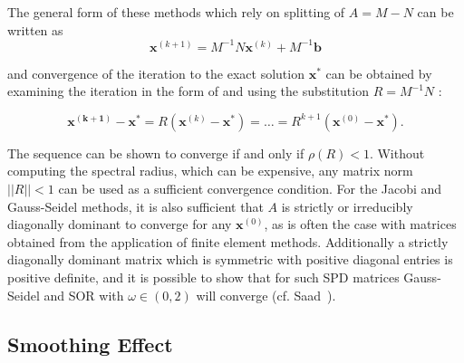 
The general form of these methods which rely on splitting of $A = M - N$ can be written as
\begin{equation}
	\mathbf{x}^{(k+1)} = M^{-1}N\mathbf{x}^{(k)} + M^{-1}\mathbf{b}
\end{equation}

and convergence of the iteration to the exact solution $\mathbf{x}^*$ can be obtained by examining the iteration in the form of and using the substitution $R = M^{-1}N $ :

\begin{equation}
	\mathbf{x^{(k+1)}} - \mathbf{x}^* = R\left(\mathbf{x}^{(k)} - \mathbf{x}^* \right) = \ldots = R^{k+1}\left(\mathbf{x}^{(0)} - \mathbf{x}^* \right).
\end{equation}


The sequence can be shown to converge if and only if $\rho\left( R \right) < 1$. Without computing the spectral radius, which can be expensive, any matrix norm $|| R || < 1$ can be used as a sufficient convergence condition. For the Jacobi and Gauss-Seidel methods, it is also sufficient that $A$ is strictly or irreducibly diagonally dominant to converge for any $\mathbf{x}^{(0)}$, as is often the case with matrices obtained from the application of finite element methods. Additionally a strictly diagonally dominant matrix which is symmetric with positive diagonal entries is positive definite, and it is possible to show that for such SPD matrices Gauss-Seidel and SOR with $\omega \in (0, 2)$ will converge (cf. Saad~\cite{Saad2003}). %


%

\subsection{Smoothing Effect}

